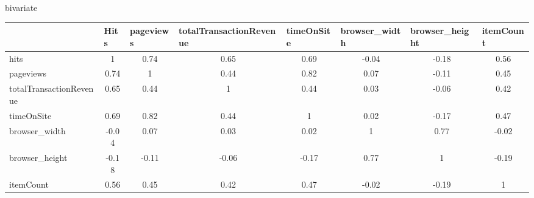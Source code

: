 bivariate
\begin{table}[ht]
\begin{adjustbox}{width=1\textwidth}
\small
\begin{tabular}{|l|c|c|c|c|c|c|c|}
\hline
                        & \multicolumn{1}{l|}{Hits} & \multicolumn{1}{l|}{pageviews} & \multicolumn{1}{l|}{totalTransactionRevenue} & \multicolumn{1}{l|}{timeOnSite} & \multicolumn{1}{l|}{browser\_width} & \multicolumn{1}{l|}{browser\_height} & \multicolumn{1}{l|}{itemCount} \\ \hline
hits                    & 1                         & \cellcolor{green!15} 0.74                           & 0.65                                         & 0.69                            & -0.04                               & -0.18                                & 0.56                           \\ \hline
pageviews               & \cellcolor{green!15}0.74                      & 1                              & 0.44                                         & \cellcolor{green!15}0.82                            & 0.07                                & -0.11                                & 0.45                           \\ \hline
totalTransactionRevenue & 0.65                      & 0.44                           & 1                                            & 0.44                            & 0.03                                & -0.06                                & 0.42                           \\ \hline
timeOnSite              & 0.69                      &\cellcolor{green!15} 0.82                           & 0.44                                         & 1                               & 0.02                                & -0.17                                & 0.47                           \\ \hline
browser\_width          & -0.04                     & 0.07                           & 0.03                                         & 0.02                            & 1                                   & \cellcolor{green!15}0.77                                 & -0.02                          \\ \hline
browser\_height         & -0.18                     & -0.11                          & -0.06                                        & -0.17                           &\cellcolor{green!15} 0.77                                & 1                                    & -0.19                          \\ \hline
itemCount               & 0.56                      & 0.45                           & 0.42                                         & 0.47                            & -0.02                               & -0.19                                & 1                              \\ \hline
\end{tabular}
\end{adjustbox}
\end{table}


